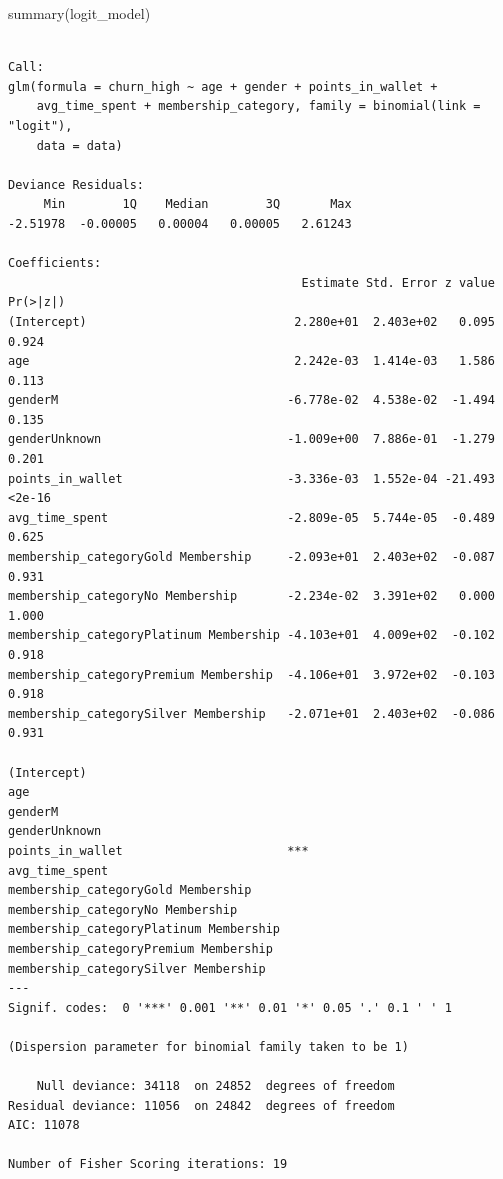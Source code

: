 \documentclass[
  letterpaper,
  DIV=11,
  numbers=noendperiod]{scrartcl}
\newenvironment{Shaded}{\begin{snugshade}}{\end{snugshade}}
\newcommand{\FunctionTok}[1]{\textcolor[rgb]{0.28,0.35,0.67}{#1}}
\newcommand{\NormalTok}[1]{\textcolor[rgb]{0.00,0.23,0.31}{#1}}
\begin{document}
\begin{Shaded}
\begin{Highlighting}[]
\FunctionTok{summary}\NormalTok{(logit\_model)}
\end{Highlighting}
\end{Shaded}

\begin{verbatim}

Call:
glm(formula = churn_high ~ age + gender + points_in_wallet + 
    avg_time_spent + membership_category, family = binomial(link = "logit"), 
    data = data)

Deviance Residuals: 
     Min        1Q    Median        3Q       Max  
-2.51978  -0.00005   0.00004   0.00005   2.61243  

Coefficients:
                                         Estimate Std. Error z value Pr(>|z|)
(Intercept)                             2.280e+01  2.403e+02   0.095    0.924
age                                     2.242e-03  1.414e-03   1.586    0.113
genderM                                -6.778e-02  4.538e-02  -1.494    0.135
genderUnknown                          -1.009e+00  7.886e-01  -1.279    0.201
points_in_wallet                       -3.336e-03  1.552e-04 -21.493   <2e-16
avg_time_spent                         -2.809e-05  5.744e-05  -0.489    0.625
membership_categoryGold Membership     -2.093e+01  2.403e+02  -0.087    0.931
membership_categoryNo Membership       -2.234e-02  3.391e+02   0.000    1.000
membership_categoryPlatinum Membership -4.103e+01  4.009e+02  -0.102    0.918
membership_categoryPremium Membership  -4.106e+01  3.972e+02  -0.103    0.918
membership_categorySilver Membership   -2.071e+01  2.403e+02  -0.086    0.931
                                          
(Intercept)                               
age                                       
genderM                                   
genderUnknown                             
points_in_wallet                       ***
avg_time_spent                            
membership_categoryGold Membership        
membership_categoryNo Membership          
membership_categoryPlatinum Membership    
membership_categoryPremium Membership     
membership_categorySilver Membership      
---
Signif. codes:  0 '***' 0.001 '**' 0.01 '*' 0.05 '.' 0.1 ' ' 1

(Dispersion parameter for binomial family taken to be 1)

    Null deviance: 34118  on 24852  degrees of freedom
Residual deviance: 11056  on 24842  degrees of freedom
AIC: 11078

Number of Fisher Scoring iterations: 19
\end{verbatim}
\end{document}
